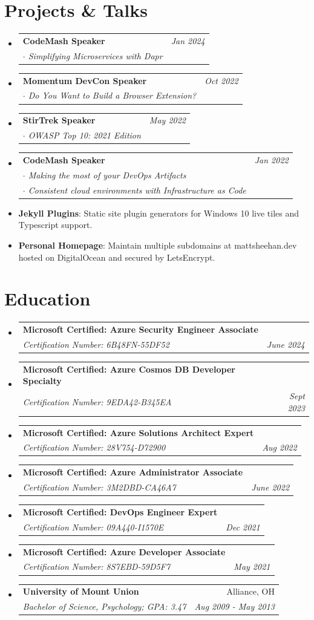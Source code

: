 \documentclass[letterpaper,11pt]{article}
\makeatletter
\newcommand{\resumeItem}[2]{
  \item\small{
    \textbf{#1}{: #2 \vspace{-2pt}}
  }
}
\newcommand{\resumeSubheading}[4]{
  \vspace{-1pt}\item
    \begin{tabular*}{0.97\textwidth}[t]{l@{\extracolsep{\fill}}r}
      \textbf{#1} & #2 \\
      \textit{\small#3} & \textit{\small #4} \\
    \end{tabular*}\vspace{-5pt}
}
\newcommand{\resumeSubheadingMultiline}[5]{
  \vspace{-1pt}\item
    \begin{tabular*}{0.97\textwidth}[t]{l@{\extracolsep{\fill}}r}
      \textbf{#1} & #2 \\
      \textit{\small#3} & \textit{\small #4} \\
      \textit{\small#5} \\
    \end{tabular*}\vspace{-6pt}
}
\newcommand{\resumeSubItem}[2]{\resumeItem{#1}{#2}\vspace{-4pt}}
\newcommand{\resumeSubHeadingListStart}{\begin{itemize}[leftmargin=*]}
\newcommand{\resumeSubHeadingListEnd}{\end{itemize}}
\makeatother
\begin{document}
\section{Projects \& Talks}
  \resumeSubHeadingListStart
    \resumeSubheading
      {CodeMash Speaker}{\textit{\small Jan 2024}}
      {$\cdot$ Simplifying Microservices with Dapr}{}\vspace{-4pt}
    \resumeSubheading
      {Momentum DevCon Speaker}{\textit{\small Oct 2022}}
      {$\cdot$ Do You Want to Build a Browser Extension?}{}\vspace{-4pt}
    \resumeSubheading
      {StirTrek Speaker}{\textit{\small May 2022}}
      {$\cdot$ OWASP Top 10: 2021 Edition}{}\vspace{-4pt}
    \resumeSubheadingMultiline
      {CodeMash Speaker}{\textit{\small Jan 2022}}
      {$\cdot$ Making the most of your DevOps Artifacts}{}
      {$\cdot$ Consistent cloud environments with Infrastructure as Code}
    \resumeSubItem{Jekyll Plugins}
      {Static site plugin generators for Windows 10 live tiles and Typescript support.}
    \resumeSubItem{Personal Homepage}
      {Maintain multiple subdomains at mattsheehan.dev hosted on DigitalOcean and secured by LetsEncrypt.}
  \resumeSubHeadingListEnd


\section{Education}
  \resumeSubHeadingListStart
    \resumeSubheading
      {Microsoft Certified: Azure Security Engineer Associate}{}
      {Certification Number: 6B48FN-55DF52}{June 2024}
    \resumeSubheading
      {Microsoft Certified: Azure Cosmos DB Developer Specialty}{}
      {Certification Number: 9EDA42-B345EA}{Sept 2023}
    \resumeSubheading
      {Microsoft Certified: Azure Solutions Architect Expert}{}
      {Certification Number: 28V754-D72900}{Aug 2022}
    \resumeSubheading
      {Microsoft Certified: Azure Administrator Associate}{}
      {Certification Number: 3M2DBD-CA46A7}{June 2022}
    \resumeSubheading
      {Microsoft Certified: DevOps Engineer Expert}{}
      {Certification Number: 09A440-I1570E}{Dec 2021}
    \resumeSubheading
      {Microsoft Certified: Azure Developer Associate}{}
      {Certification Number: 8S7EBD-59D5F7}{May 2021}
    \resumeSubheading
      {University of Mount Union}{Alliance, OH}
      {Bachelor of Science, Psychology;  GPA: 3.47}{Aug 2009 - May 2013}
  \resumeSubHeadingListEnd


%
%

\end{document}
